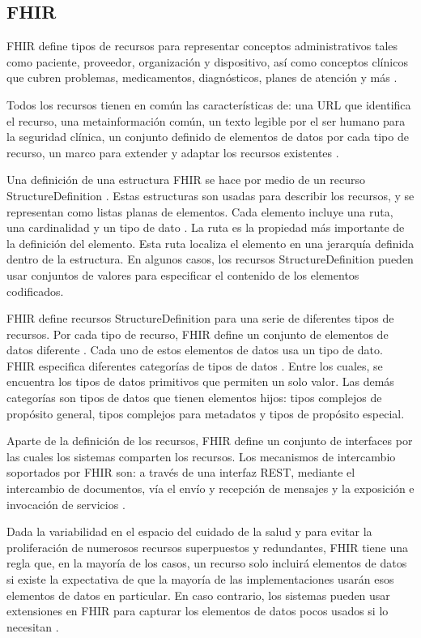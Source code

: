 \subsection{FHIR}

FHIR define tipos de recursos para representar conceptos administrativos tales como paciente, proveedor, organización y dispositivo, así como conceptos clínicos que cubren problemas, medicamentos, diagnósticos, planes de atención y más \cite{FHIRResourceList}.

Todos los recursos tienen en común las características de: una URL que identifica el recurso, una metainformación común, un texto legible por el ser humano para la seguridad clínica, un conjunto definido de elementos de datos por cada tipo de recurso, un marco para extender y adaptar los recursos existentes \cite{FHIRDeveloper}.

Una definición de una estructura FHIR se hace por medio de un recurso StructureDefinition \cite{FHIRStructureDefinition}. Estas estructuras son usadas para describir los recursos, y se representan como listas planas de elementos. Cada elemento incluye una ruta, una cardinalidad y un tipo de dato \cite{FHIRElementDefinition}. La ruta es la propiedad más importante de la definición del elemento. Esta ruta localiza el elemento en una jerarquía definida dentro de la estructura. En algunos casos, los recursos StructureDefinition pueden usar conjuntos de valores para especificar el contenido de los elementos codificados.

FHIR define recursos StructureDefinition para una serie de diferentes tipos de recursos. Por cada tipo de recurso, FHIR define un conjunto de elementos de datos diferente \cite{FHIRResource}. Cada uno de estos elementos de datos usa un tipo de dato. FHIR especifica diferentes categorías de tipos de datos \cite{FHIRDataTypes}. Entre los cuales, se encuentra los tipos de datos primitivos que permiten un solo valor. Las demás categorías son tipos de datos que tienen elementos hijos: tipos complejos de propósito general, tipos complejos para metadatos y tipos de propósito especial.

Aparte de la definición de los recursos, FHIR define un conjunto de interfaces por las cuales los sistemas comparten los recursos. Los mecanismos de intercambio soportados por FHIR son: a través de una interfaz REST, mediante el intercambio de documentos, vía el envío y recepción de mensajes y la exposición e invocación de servicios \cite{FHIRClinician}.

Dada la variabilidad en el espacio del cuidado de la salud y para evitar la proliferación de numerosos recursos superpuestos y redundantes, FHIR tiene una regla que, en la mayoría de los casos, un recurso solo incluirá elementos de datos si existe la expectativa de que la mayoría de las implementaciones usarán esos elementos de datos en particular. En caso contrario, los sistemas pueden usar extensiones en FHIR para capturar los elementos de datos pocos usados si lo necesitan \cite{FHIRArchitecture}.

